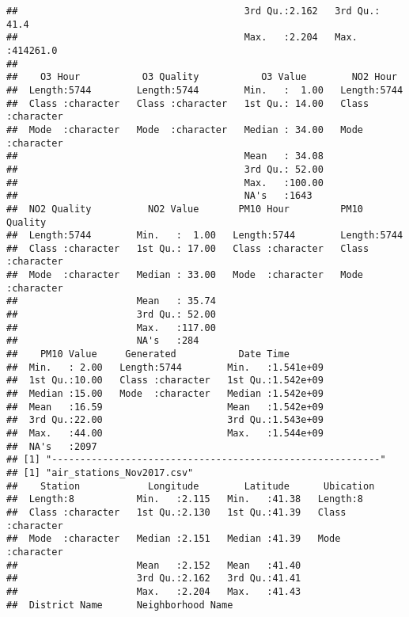 \documentclass[
]{article}
\begin{document}
\begin{verbatim}
##                                        3rd Qu.:2.162   3rd Qu.:    41.4  
##                                        Max.   :2.204   Max.   :414261.0  
##                                                                          
##    O3 Hour           O3 Quality           O3 Value        NO2 Hour        
##  Length:5744        Length:5744        Min.   :  1.00   Length:5744       
##  Class :character   Class :character   1st Qu.: 14.00   Class :character  
##  Mode  :character   Mode  :character   Median : 34.00   Mode  :character  
##                                        Mean   : 34.08                     
##                                        3rd Qu.: 52.00                     
##                                        Max.   :100.00                     
##                                        NA's   :1643                       
##  NO2 Quality          NO2 Value       PM10 Hour         PM10 Quality      
##  Length:5744        Min.   :  1.00   Length:5744        Length:5744       
##  Class :character   1st Qu.: 17.00   Class :character   Class :character  
##  Mode  :character   Median : 33.00   Mode  :character   Mode  :character  
##                     Mean   : 35.74                                        
##                     3rd Qu.: 52.00                                        
##                     Max.   :117.00                                        
##                     NA's   :284                                           
##    PM10 Value     Generated           Date Time        
##  Min.   : 2.00   Length:5744        Min.   :1.541e+09  
##  1st Qu.:10.00   Class :character   1st Qu.:1.542e+09  
##  Median :15.00   Mode  :character   Median :1.542e+09  
##  Mean   :16.59                      Mean   :1.542e+09  
##  3rd Qu.:22.00                      3rd Qu.:1.543e+09  
##  Max.   :44.00                      Max.   :1.544e+09  
##  NA's   :2097                                          
## [1] "----------------------------------------------------------"
## [1] "air_stations_Nov2017.csv"
##    Station            Longitude        Latitude      Ubication        
##  Length:8           Min.   :2.115   Min.   :41.38   Length:8          
##  Class :character   1st Qu.:2.130   1st Qu.:41.39   Class :character  
##  Mode  :character   Median :2.151   Median :41.39   Mode  :character  
##                     Mean   :2.152   Mean   :41.40                     
##                     3rd Qu.:2.162   3rd Qu.:41.41                     
##                     Max.   :2.204   Max.   :41.43                     
##  District Name      Neighborhood Name 

\end{verbatim}
\end{document}
